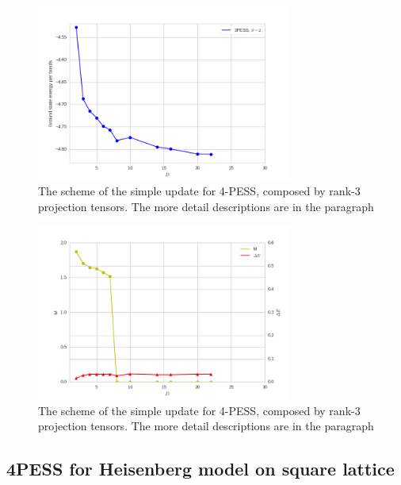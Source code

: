 \begin{figure}[H]
	\centering
	\includegraphics[width=0.75\textwidth]{figures/3pess_S2GE.png}
	\caption[The scheme of the simple update for 4-PESS, composed by rank-3 projection tensors.]{The scheme of the simple update for 4-PESS, composed by rank-3 projection tensors. The more detail descriptions are in the paragraph}
	\label{fig4330}
\end{figure}

\begin{figure}[!ht]
	\centering
	\includegraphics[width=0.75\textwidth]{figures/3pess_S2M.png}
	\caption[The scheme of the simple update for 4-PESS, composed by rank-3 projection tensors.]{The scheme of the simple update for 4-PESS, composed by rank-3 projection tensors. The more detail descriptions are in the paragraph}
	\label{fig4330}
\end{figure}

\subsection{4PESS for Heisenberg model on square lattice}

